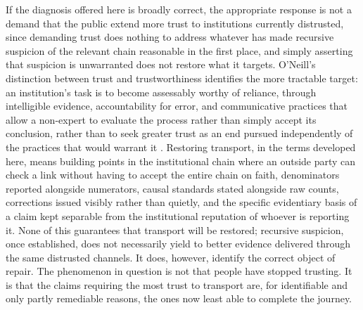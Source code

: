 \documentclass[11pt]{article}
\begin{document}
If the diagnosis offered here is broadly correct, the appropriate response is not a demand that the public extend more trust to institutions currently distrusted, since demanding trust does nothing to address whatever has made recursive suspicion of the relevant chain reasonable in the first place, and simply asserting that suspicion is unwarranted does not restore what it targets. O'Neill's distinction between trust and trustworthiness identifies the more tractable target: an institution's task is to become assessably worthy of reliance, through intelligible evidence, accountability for error, and communicative practices that allow a non-expert to evaluate the process rather than simply accept its conclusion, rather than to seek greater trust as an end pursued independently of the practices that would warrant it \citep{oneill2002}. Restoring transport, in the terms developed here, means building points in the institutional chain where an outside party can check a link without having to accept the entire chain on faith, denominators reported alongside numerators, causal standards stated alongside raw counts, corrections issued visibly rather than quietly, and the specific evidentiary basis of a claim kept separable from the institutional reputation of whoever is reporting it. None of this guarantees that transport will be restored; recursive suspicion, once established, does not necessarily yield to better evidence delivered through the same distrusted channels. It does, however, identify the correct object of repair. The phenomenon in question is not that people have stopped trusting. It is that the claims requiring the most trust to transport are, for identifiable and only partly remediable reasons, the ones now least able to complete the journey.
\end{document}
